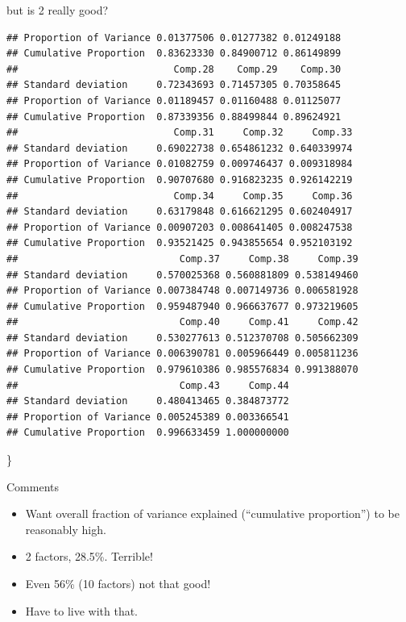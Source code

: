 \documentclass[ignorenonframetext,]{beamer}
\begin{document}
\begin{frame}[fragile]{but is 2 really good?}
\begin{verbatim}
## Proportion of Variance 0.01377506 0.01277382 0.01249188
## Cumulative Proportion  0.83623330 0.84900712 0.86149899
##                           Comp.28    Comp.29    Comp.30
## Standard deviation     0.72343693 0.71457305 0.70358645
## Proportion of Variance 0.01189457 0.01160488 0.01125077
## Cumulative Proportion  0.87339356 0.88499844 0.89624921
##                           Comp.31     Comp.32     Comp.33
## Standard deviation     0.69022738 0.654861232 0.640339974
## Proportion of Variance 0.01082759 0.009746437 0.009318984
## Cumulative Proportion  0.90707680 0.916823235 0.926142219
##                           Comp.34     Comp.35     Comp.36
## Standard deviation     0.63179848 0.616621295 0.602404917
## Proportion of Variance 0.00907203 0.008641405 0.008247538
## Cumulative Proportion  0.93521425 0.943855654 0.952103192
##                            Comp.37     Comp.38     Comp.39
## Standard deviation     0.570025368 0.560881809 0.538149460
## Proportion of Variance 0.007384748 0.007149736 0.006581928
## Cumulative Proportion  0.959487940 0.966637677 0.973219605
##                            Comp.40     Comp.41     Comp.42
## Standard deviation     0.530277613 0.512370708 0.505662309
## Proportion of Variance 0.006390781 0.005966449 0.005811236
## Cumulative Proportion  0.979610386 0.985576834 0.991388070
##                            Comp.43     Comp.44
## Standard deviation     0.480413465 0.384873772
## Proportion of Variance 0.005245389 0.003366541
## Cumulative Proportion  0.996633459 1.000000000
\end{verbatim}

\}

\end{frame}

\begin{frame}{Comments}
\protect\hypertarget{comments-28}{}

\begin{itemize}
\item
  Want overall fraction of variance explained (``cumulative
  proportion'') to be reasonably high.
\item
  2 factors, 28.5\%. Terrible!
\item
  Even 56\% (10 factors) not that good!
\item
  Have to live with that.
\end{itemize}

\end{frame}
\end{document}
